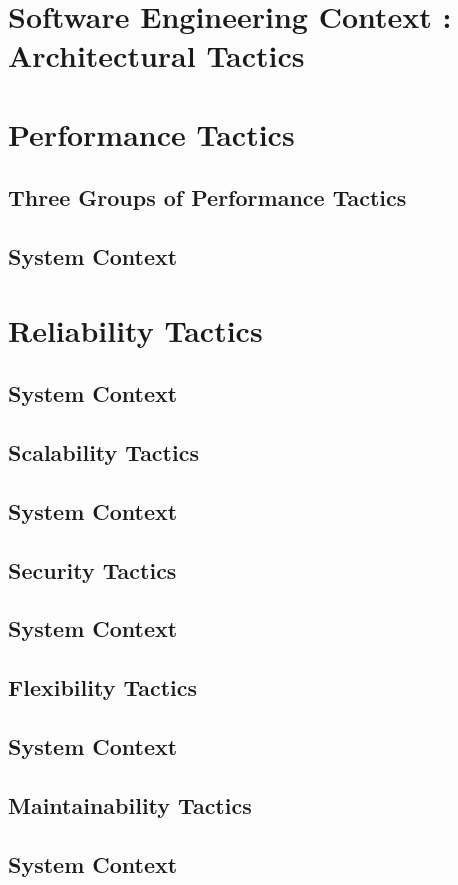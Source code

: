 \documentclass[11pt,fleqn]{book} %
\begin{document}
\section{Software Engineering Context : Architectural Tactics}
\section{Performance Tactics}
	\subsection{Three Groups of Performance Tactics}
	\subsection{System Context}
\section{Reliability Tactics}
	\subsection{System Context}
\subsection{Scalability Tactics}
	\subsection{System Context}
\subsection{Security Tactics}
	\subsection{System Context}
\subsection{Flexibility Tactics}
	\subsection{System Context}
\subsection{Maintainability Tactics}
	\subsection{System Context}
\end{document}
